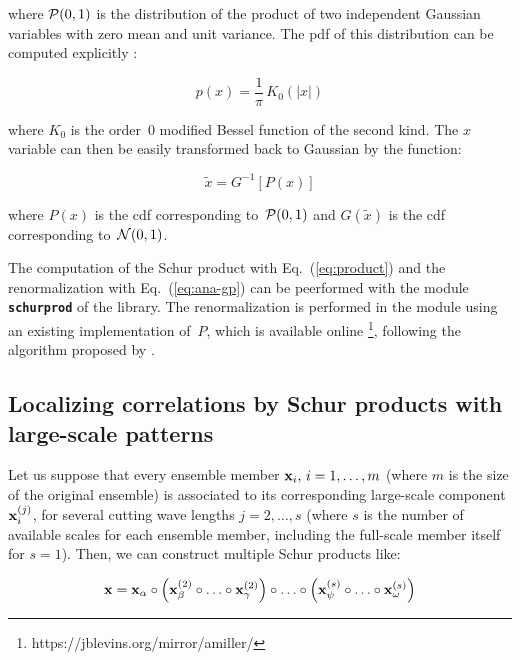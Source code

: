 \documentclass[11pt]{article}
\begin{document}
\noindent
where ${\cal P}(0,1)$ is the distribution of the product of two independent
Gaussian variables with zero mean and unit variance.
The pdf of this distribution can be computed explicitly \citep{NADA15}:

\begin{equation}
p(x) = \frac{1}{\pi} \, K_0 (|x|)
\end{equation}

\noindent
where $K_0$ is the order~0 modified Bessel function of the second kind.
The $x$ variable can then be easily transformed back to Gaussian by the function:

\begin{equation}
\label{eq:ana-gp}
\tilde{x} = G^{-1} \left[ P(x) \right]
\end{equation}

\noindent
where $P(x)$ is the cdf corresponding to~${\cal P}(0,1)$ and
$G(\tilde{x})$ is the cdf corresponding to~${\cal N}(0,1)$.

The computation of the Schur product with Eq.~(\ref{eq:product})
and the renormalization with Eq.~(\ref{eq:ana-gp})
can be peerformed with the module {\bf\tt schurprod} of the library.
The renormalization is performed in the module
using an existing implementation of~$P$, which is available online%
\footnote{https://jblevins.org/mirror/amiller/},
following the algorithm proposed by \citet{MEEK94}.

\subsection{Localizing correlations by Schur products with large-scale patterns}

Let us suppose that every ensemble member ${\bf x}_i,\,i=1,\ldots,m$
(where $m$ is the size of the original ensemble) is associated
to its corresponding large-scale component ${\bf x}_i^{(j)}$,
for several cutting wave lengths $j=2,\ldots,s$
(where $s$ is the number of available scales for each ensemble member,
including the full-scale member itself for $s=1$).
Then, we can construct multiple Schur products like:

\begin{equation}
\label{eq:multiple_product}
{\bf x} = {\bf x_\alpha} \circ \left( {\bf x}_\beta^{(2)} \circ \ldots \circ {\bf x}_\gamma^{(2)} \right)
            \circ \ldots \circ \left( {\bf x}_\psi^{(s)} \circ \ldots \circ {\bf x}_\omega^{(s)} \right)
\end{equation}
\end{document}
